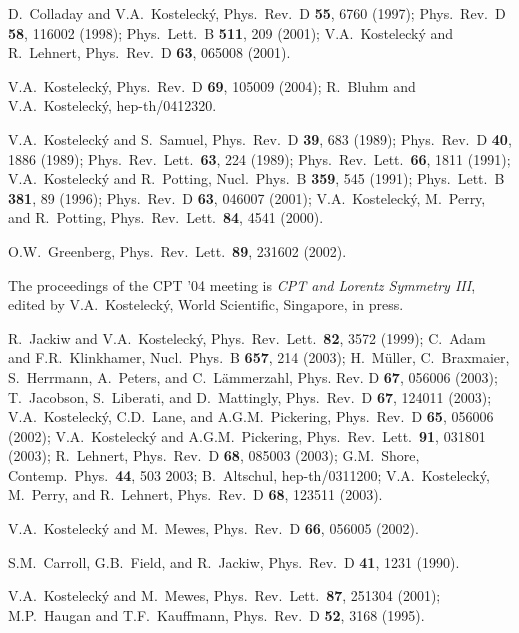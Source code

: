 \documentclass[twocolumn]{revtex4}
\begin{document}
\begin{thebibliography}{99}

D.\ Colladay and V.A.\ Kosteleck\'y,
Phys.\ Rev.\ D {\bf 55}, 6760 (1997);
Phys.\ Rev.\ D {\bf 58}, 116002 (1998);
Phys.\ Lett.\ B {\bf 511}, 209 (2001);
V.A.\ Kosteleck\'y and R.\ Lehnert,
Phys.\ Rev.\ D {\bf 63}, 065008 (2001).

V.A.\ Kosteleck\'y,
Phys.\ Rev.\ D {\bf 69}, 105009 (2004);
R.\ Bluhm and V.A.\ Kosteleck\'y,
hep-th/0412320.

V.A.\ Kosteleck\'y and S.\ Samuel,
Phys.\ Rev.\ D {\bf 39}, 683 (1989);
Phys.\ Rev.\ D {\bf 40}, 1886 (1989);
Phys.\ Rev.\ Lett.\ {\bf 63}, 224 (1989);
Phys.\ Rev.\ Lett.\ {\bf 66}, 1811 (1991);
V.A.\ Kosteleck\'y and R.\ Potting,
Nucl.\ Phys.\ B {\bf 359}, 545 (1991);
Phys.\ Lett.\ B {\bf 381}, 89 (1996);
Phys.\ Rev.\ D {\bf 63}, 046007 (2001);
V.A.\ Kosteleck\'y, M.\ Perry, and R.\ Potting,
Phys.\ Rev.\ Lett.\ {\bf 84}, 4541 (2000).

O.W.\ Greenberg,
Phys.\ Rev.\ Lett.\ {\bf 89}, 231602 (2002).

The proceedings of the CPT '04
meeting is {\it CPT and Lorentz Symmetry III},
edited by
V.A.\ Kosteleck\'y,
World Scientific, Singapore, in press.

R.\ Jackiw and V.A.\ Kosteleck\'y,
Phys.\ Rev.\ Lett.\ {\bf 82}, 3572 (1999);
C.\ Adam and F.R.\ Klinkhamer,
Nucl.\ Phys.\ B {\bf 657}, 214 (2003);
H.\ M\"uller, C.\ Braxmaier, S.\ Herrmann,
A.\ Peters, and C.\ L\"ammerzahl,
Phys. Rev. D {\bf 67}, 056006 (2003);
T.\ Jacobson, S.\ Liberati, and D.\ Mattingly,
Phys.\ Rev.\ D {\bf 67}, 124011 (2003);
V.A.\ Kosteleck\'y, C.D.\ Lane, and A.G.M.\ Pickering,
Phys.\ Rev.\ D {\bf 65}, 056006 (2002);
V.A.\ Kosteleck\'y and A.G.M.\ Pickering,
Phys.\ Rev.\ Lett.\ {\bf 91}, 031801 (2003);
R.\ Lehnert,
Phys.\ Rev.\ D {\bf 68}, 085003 (2003);
G.M.\ Shore,
Contemp.\ Phys.\ {\bf 44}, 503 {2003};
B.\ Altschul, hep-th/0311200;
V.A.\ Kosteleck\'y, M.\ Perry, and R.\ Lehnert,
Phys.\ Rev.\ D {\bf 68}, 123511 (2003).

V.A.\ Kosteleck\'y and M.\ Mewes,
Phys.\ Rev.\ D {\bf 66}, 056005 (2002).

S.M.\ Carroll, G.B.\ Field, and R.\ Jackiw,
Phys.\ Rev.\ D {\bf 41}, 1231 (1990).

V.A.\ Kosteleck\'y and M.\ Mewes,
Phys.\ Rev.\ Lett.\ {\bf 87}, 251304 (2001);
M.P.\ Haugan and T.F.\ Kauffmann,
Phys.\ Rev.\ D {\bf 52}, 3168 (1995).


\end{thebibliography}
\end{document}
